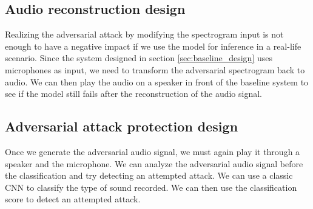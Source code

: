 \subsection{Audio reconstruction design}

Realizing the adversarial attack by modifying the spectrogram input is not enough to have a negative impact if we use the model for inference in a real-life scenario. Since the system designed in section \ref{sec:baseline_design} uses microphones as input, we need to transform the adversarial spectrogram back to audio. We can then play the audio on a speaker in front of the baseline system to see if the model still fails after the reconstruction of the audio signal.

\subsection{Adversarial attack protection design}

Once we generate the adversarial audio signal, we must again play it through a speaker and the microphone. We can analyze the adversarial audio signal before the classification and try detecting an attempted attack. We can use a classic CNN to classify the type of sound recorded. We can then use the classification score to detect an attempted attack.